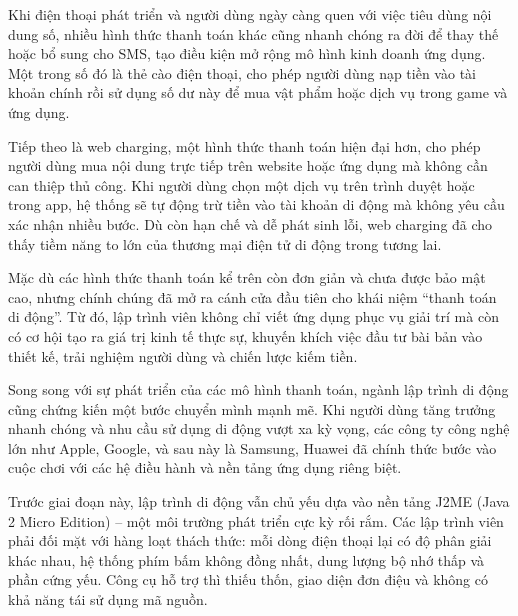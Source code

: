 \begin{flushleft}
\hspace*{0.8cm}Khi điện thoại phát triển và người dùng ngày càng quen với việc tiêu dùng nội dung số, nhiều hình thức thanh toán khác cũng nhanh chóng ra đời để thay thế hoặc bổ sung cho SMS, tạo điều kiện mở rộng mô hình kinh doanh ứng dụng. Một trong số đó là thẻ cào điện thoại, cho phép người dùng nạp tiền vào tài khoản chính rồi sử dụng số dư này để mua vật phẩm hoặc dịch vụ trong game và ứng dụng.
\end{flushleft}

\begin{flushleft}
\hspace*{0.8cm}Tiếp theo là web charging, một hình thức thanh toán hiện đại hơn, cho phép người dùng mua nội dung trực tiếp trên website hoặc ứng dụng mà không cần can thiệp thủ công. Khi người dùng chọn một dịch vụ trên trình duyệt hoặc trong app, hệ thống sẽ tự động trừ tiền vào tài khoản di động mà không yêu cầu xác nhận nhiều bước. Dù còn hạn chế và dễ phát sinh lỗi, web charging đã cho thấy tiềm năng to lớn của thương mại điện tử di động trong tương lai.
\end{flushleft}

\begin{flushleft}
\hspace*{0.8cm}Mặc dù các hình thức thanh toán kể trên còn đơn giản và chưa được bảo mật cao, nhưng chính chúng đã mở ra cánh cửa đầu tiên cho khái niệm “thanh toán di động”. Từ đó, lập trình viên không chỉ viết ứng dụng phục vụ giải trí mà còn có cơ hội tạo ra giá trị kinh tế thực sự, khuyến khích việc đầu tư bài bản vào thiết kế, trải nghiệm người dùng và chiến lược kiếm tiền.
\end{flushleft}

\begin{flushleft}
\hspace*{0.8cm}Song song với sự phát triển của các mô hình thanh toán, ngành lập trình di động cũng chứng kiến một bước chuyển mình mạnh mẽ. Khi người dùng tăng trưởng nhanh chóng và nhu cầu sử dụng di động vượt xa kỳ vọng, các công ty công nghệ lớn như Apple, Google, và sau này là Samsung, Huawei đã chính thức bước vào cuộc chơi với các hệ điều hành và nền tảng ứng dụng riêng biệt.
\end{flushleft}

\begin{flushleft}
\hspace*{0.8cm}Trước giai đoạn này, lập trình di động vẫn chủ yếu dựa vào nền tảng J2ME (Java 2 Micro Edition) – một môi trường phát triển cực kỳ rối rắm. Các lập trình viên phải đối mặt với hàng loạt thách thức: mỗi dòng điện thoại lại có độ phân giải khác nhau, hệ thống phím bấm không đồng nhất, dung lượng bộ nhớ thấp và phần cứng yếu. Công cụ hỗ trợ thì thiếu thốn, giao diện đơn điệu và không có khả năng tái sử dụng mã nguồn.
\end{flushleft}

